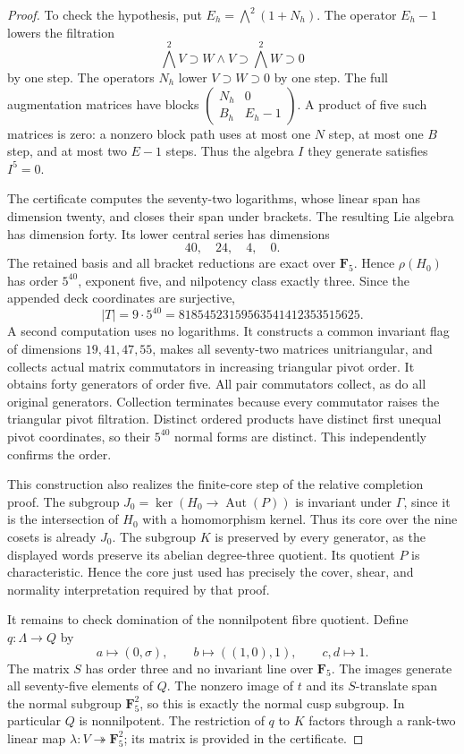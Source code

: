 \begin{proof}
To check the hypothesis, put $E_h=\bigwedge^2(1+N_h)$. The
operator $E_h-1$ lowers the filtration
\[
 \bigwedge^2 V\supset W\wedge V\supset\bigwedge^2 W\supset0
\]
by one step. The operators $N_h$ lower $V\supset W\supset0$
by one step. The full augmentation matrices have blocks
$\left(\begin{smallmatrix}N_h&0\\ B_h&E_h-1\end{smallmatrix}\right)$.
A product of five such matrices is zero: a nonzero block path uses
at most one $N$ step, at most one $B$ step, and at most two $E-1$
steps. Thus the algebra $I$ they generate satisfies $I^5=0$.

The certificate computes the seventy-two logarithms, whose linear
span has dimension twenty, and closes their span under brackets.
The resulting Lie algebra has dimension forty. Its lower central
series has dimensions
\[
                   40,\quad24,\quad4,\quad0.
\]
The retained basis and all bracket reductions are exact over
$\mathbf F _5$. Hence $\rho(H_0)$ has order $5^{40}$, exponent
five, and nilpotency class exactly three. Since the appended deck
coordinates are surjective,
\[
             |T|=9\cdot5^{40}
                =81854523159563541412353515625.
\]
A second computation uses no logarithms. It constructs a common
invariant flag of dimensions $19,41,47,55$, makes all seventy-two
matrices unitriangular, and collects actual matrix commutators in
increasing triangular pivot order. It obtains forty generators of
order five. All pair commutators collect, as do all original
generators. Collection terminates because every commutator raises
the triangular pivot filtration. Distinct ordered products have
distinct first unequal pivot coordinates, so their $5^{40}$ normal
forms are distinct. This independently confirms the order.

This construction also realizes the finite-core step of the relative
completion proof. The subgroup
$J_0=\ker(H_0\to\operatorname{Aut}(P))$ is invariant under
$\Gamma$, since it is the intersection of $H_0$ with a homomorphism
kernel. Thus its core over the nine cosets is already $J_0$.
The subgroup $K$ is preserved by every generator, as the displayed
words preserve its abelian degree-three quotient. Its quotient $P$
is characteristic. Hence the core just used has precisely the
cover, shear, and normality interpretation required by that proof.

It remains to check domination of the nonnilpotent fibre quotient.
Define $q:\Lambda\to Q$ by
\[
 a\mapsto(0,\sigma),\qquad b\mapsto((1,0),1),
 \qquad c,d\mapsto1.
\]
The matrix $S$ has order three and no invariant line over
$\mathbf F _5$. The images generate all seventy-five elements of
$Q$. The nonzero image of $t$ and its $S$-translate span the
normal subgroup $\mathbf F _5^2$, so this is exactly the normal
cusp subgroup. In particular $Q$ is nonnilpotent. The restriction
of $q$ to $K$ factors through a rank-two linear map
$\lambda:V\twoheadrightarrow\mathbf F _5^2$; its matrix is
provided in the certificate.


\end{proof}
